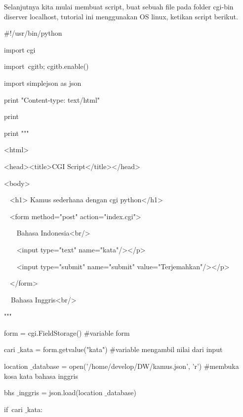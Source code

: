\begin{enumerate}
\vspace{12pt}
\noindent 
Selanjutnya kita mulai membuat script, buat sebuah file pada folder cgi-bin diserver localhost, tutorial ini menggunakan OS linux, ketikan script berikut. \par
\noindent 
$  \#  $!/usr/bin/python \par
\noindent 
import cgi \par
\noindent 
import~cgitb; cgitb.enable()   \par
\noindent 
import simplejson as json \par
\vspace{12pt}
\noindent 
print "Content-type: text/html" \par
\noindent 
print \par
\vspace{12pt}
\noindent 
print """ \par
\noindent 
<html> \par
\noindent 
<head><title>CGI Script</title></head> \par
\noindent 
<body> \par
\noindent 
~ <h1> Kamus sederhana dengan cgi python</h1> \par
\noindent 
~ <form method="post" action="index.cgi"> \par
\noindent 
~~~ Bahasa Indonesia<br/> \par
\noindent 
~~~ <input type="text" name="kata"/></p> \par
\noindent 
~~~ <input type="submit" name="submit" value="Terjemahkan"/></p> \par
\noindent 
~ </form> \par
\noindent 
~~Bahasa Inggris<br/>   \par
\noindent 
""" \par
\vspace{12pt}
\noindent 
form = cgi.FieldStorage()  $  \#  $variable form \par
\noindent 
cari $  \_  $kata = form.getvalue("kata")  $  \#  $variable mengambil nilai dari input \par
\vspace{12pt}
\noindent 
location $  \_  $database = open('/home/develop/DW/kamus.json', 'r')  $  \#  $membuka kosa kata bahasa inggris \par
\noindent 
bhs $  \_  $inggris = json.load(location $  \_  $database) \par
\vspace{12pt}
\noindent 
if~cari $  \_  $kata:~   \par

\end{enumerate}
